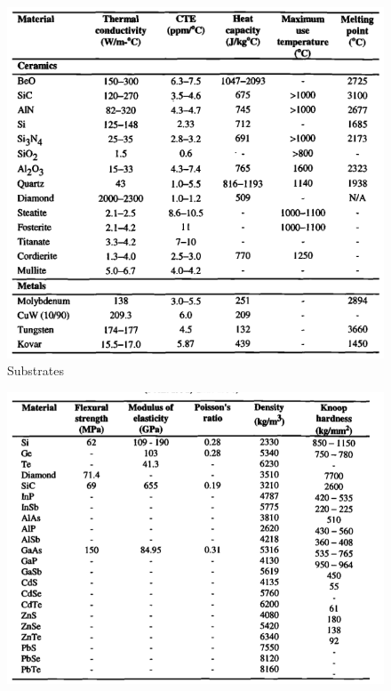 \documentclass[final]{cubedoc}
\begin{document}
	
	\begin{figure}[h!]
		\centering
		\includegraphics[keepaspectratio, width=\textwidth]{docs/substrates.png}
		\caption{Substrates \cite[p.32]{pecht1998electronic}}
		\label{fig:my_label}
	\end{figure}
	
	\begin{figure}[h!]
		\centering
		\includegraphics[keepaspectratio, width=\textwidth]{docs/density_table.png}
		\caption{\cite[p.24]{pecht1998electronic}}
		\label{fig:my_label}
	\end{figure}
	
\end{document}
